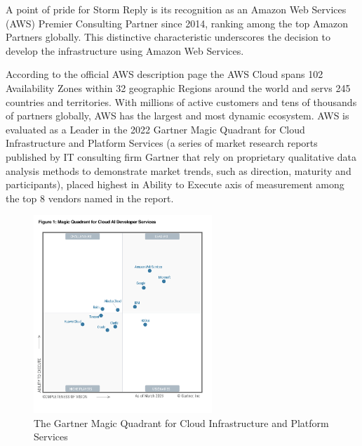 A point of pride for Storm Reply is its recognition as an Amazon Web Services (AWS) Premier Consulting Partner since 2014, ranking among the top Amazon Partners globally. This distinctive characteristic underscores the decision to develop the infrastructure using Amazon Web Services.

According to the official AWS description page \cite{AWSGlobalInfrastructure} the AWS Cloud spans 102 Availability Zones within 32 geographic Regions around the world and servs 245 countries and territories. With millions of active customers and tens of thousands of partners globally, AWS has the largest and most dynamic ecosystem. AWS is evaluated as a Leader in the 2022 Gartner Magic Quadrant for Cloud Infrastructure and Platform Services (a series of market research reports published by IT consulting firm Gartner that rely on proprietary qualitative data analysis methods to demonstrate market trends, such as direction, maturity and participants), placed highest in Ability to Execute axis of measurement among the top 8 vendors named in the report.

\begin{figure}[h]  %
  \centering
  \includegraphics[width=0.6\textwidth]{images/AWSMagicQuadrantForCloud.png}  %
  \caption{The Gartner Magic Quadrant for Cloud Infrastructure and Platform Services \cite{GartnerMagicQuadrant}}
  \label{fig:AWSMagicQuadrantForCloud}
\end{figure}

